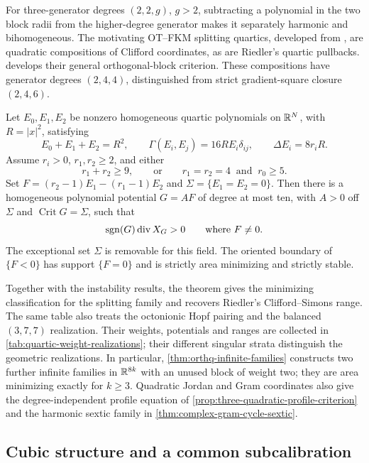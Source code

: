 For three-generator degrees $(2,2,g)$, $g>2$, subtracting a polynomial
in the two block radii from the higher-degree generator makes it
separately harmonic and bihomogeneous. The motivating OT--FKM splitting
quartics, developed from \cite{CuiFKM25}, are quadratic compositions
of Clifford coordinates, as are Riedler's quartic pullbacks.
 develops their general orthogonal-block criterion.
These compositions have generator degrees $(2,4,4)$, distinguished
from strict gradient-square closure $(2,4,6)$.

\begin{maintheorem}
\label{main:bihomogeneous}\label{main:quartic-table}
Let $E_0,E_1,E_2$ be nonzero homogeneous quartic polynomials on
$\mathbb R^N$, with $R=|x|^2$, satisfying
\[
 E_0+E_1+E_2=R^2,\qquad
 \Gamma(E_i,E_j)=16RE_i\delta_{ij},\qquad
 \Delta E_i=8r_iR.
\]
Assume $r_i>0$, $r_1,r_2\ge2$, and either
\[
 r_1+r_2\ge9,
 \qquad\text{or}\qquad
 r_1=r_2=4\ \text{ and }\ r_0\ge5.
\]
Set $F=(r_2-1)E_1-(r_1-1)E_2$ and
$\Sigma=\{E_1=E_2=0\}$. Then there is a homogeneous polynomial
potential $G=AF$ of degree at most ten, with $A>0$ off $\Sigma$
and $\operatorname{Crit}G=\Sigma$, such that
\[
 \operatorname{sgn}(G)\operatorname{div} X_G>0\qquad\text{where }F\ne0.
\]
The exceptional set $\Sigma$ is removable for this field. The
oriented boundary of $\{F<0\}$ has support $\{F=0\}$ and is
strictly area minimizing and strictly stable.
\end{maintheorem}
Together with the instability results, the theorem gives the minimizing
classification for the splitting family and recovers Riedler's
Clifford--Simons range. The same table
also treats the octonionic Hopf pairing and the balanced $(3,7,7)$
realization. Their weights, potentials and ranges are collected in
\cref{tab:quartic-weight-realizations}; their different singular
strata distinguish the geometric realizations. In particular,
\cref{thm:orthq-infinite-families} constructs two further infinite
families in $\mathbb R^{8k}$ with an unused block of weight two; they are
area minimizing exactly for $k\ge3$. Quadratic Jordan and Gram
coordinates also give the degree-independent profile equation of
\cref{prop:three-quadratic-profile-criterion} and the harmonic
sextic family in \cref{thm:complex-gram-cycle-sextic}.

\subsection{Cubic structure and a common subcalibration}

